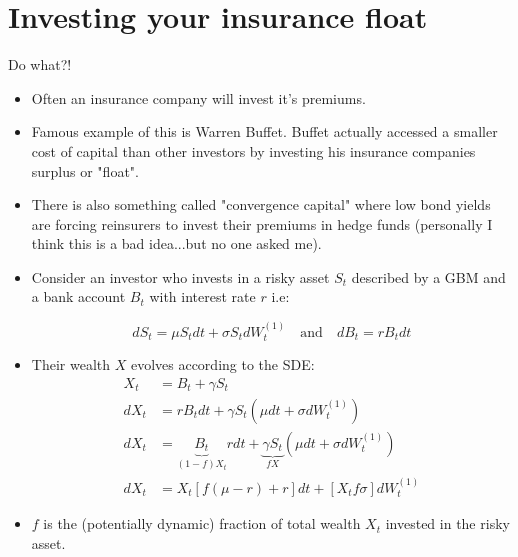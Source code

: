 \documentclass[11pt]{beamer}
\begin{document}
\section{Investing your insurance float}
\begin{frame}{Do what?!}

\begin{itemize}

\item Often an insurance company will invest it's premiums. 

\vfill

\item Famous example of this is Warren Buffet. Buffet actually accessed a smaller cost of capital than other investors by investing his insurance companies surplus or "float".

\vfill

\item  There is also something called "convergence capital" where low bond yields are forcing reinsurers to invest their premiums in hedge funds (personally I think this is a bad idea...but no one asked me).

\end{itemize}

\end{frame}
\begin{frame}

\begin{itemize}

\item Consider an investor who invests in a risky asset $S_t$ described by a GBM and a bank account $B_t$ with interest rate $r$ i.e:

\begin{equation*}\label{S/B eq}
dS_t = \mu S_t dt + \sigma S_t dW^{(1)}_t
\quad\text{and}\quad 
dB_t = r B_t dt
\end{equation*}

\item Their wealth $X$ evolves according to the SDE:  
\vspace{0.1cm}
\begin{align*}
X_t &= B_t + \gamma S_t  \\
dX_t &= r B_t dt + \gamma S_t ( \mu dt + \sigma dW^{(1)}_t)  \\
dX_t &= \underbrace{ B_t }_{(1-f)X_t} rdt + \underbrace{\gamma S_t}_{ fX } ( \mu dt + \sigma dW^{(1)}_t )  \\
dX_t &=  X_t [f(\mu-r) + r ]dt + [ X_t f\sigma ]dW^{(1)}_t\label{X dyn}
\end{align*}

\vfill

\item $f$ is the (potentially dynamic) fraction of total wealth $X_t$ invested in the risky asset.

\end{itemize}

\end{frame}
\end{document}
